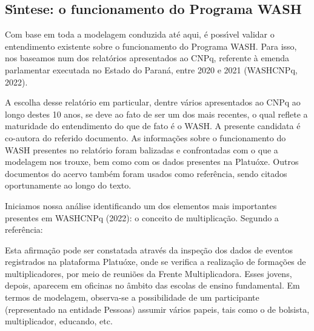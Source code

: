 \documentclass[
12pt,		%
openright,	%
twoside,  %
a4paper,			%
chapter=TITLE,		%
english,			%
french,				%
spanish,			%
brazil				%
]{USPSC-classe/USPSC}
\begin{document}
\subsection[S\'{\i}ntese: o funcionamento do Programa WASH]{S\'{\i}ntese: o funcionamento do Programa WASH}\label{S\'{\i}ntese: o funcionamento do Programa WASH}
Com base em toda a modelagem conduzida at\'e aqui, \'e poss\'{\i}vel validar o entendimento existente sobre o funcionamento do Programa WASH. Para isso, nos baseamos num dos relat\'orios apresentados ao CNPq, referente \`a emenda parlamentar executada no Estado do Paran\'a, entre 2020 e 2021  (WASHCNPq, 2022).




A escolha desse relat\'orio em particular, dentre v\'arios apresentados ao CNPq ao longo destes 10 anos, se deve ao fato de ser um dos mais recentes, o qual reflete a maturidade do entendimento do que de fato \'e o WASH. A presente candidata \'e co-autora do referido documento. As informa\c{c}\~oes sobre o funcionamento do WASH presentes no relat\'orio foram balizadas e confrontadas com o que a modelagem nos trouxe, bem como com os dados presentes na Platu\'oxe. Outros documentos do acervo tamb\'em foram usados como refer\^encia, sendo citados oportunamente ao longo do texto.




Iniciamos nossa an\'alise identificando um dos elementos mais importantes presentes em WASHCNPq (2022): o conceito de multiplica\c{c}\~ao. Segundo a refer\^encia:





\noindent\begin{center}\mbox{\centering{}}\end{center}


Esta afirma\c{c}\~ao pode ser constatada atrav\'es da inspe\c{c}\~ao dos dados de eventos registrados na plataforma Platu\'oxe, onde se verifica a realiza\c{c}\~ao de forma\c{c}\~oes de multiplicadores, por meio de reuni\~oes da Frente Multiplicadora. Esses jovens, depois, aparecem em oficinas no \^ambito das escolas de ensino fundamental. Em termos de modelagem, observa-se a possibilidade de um participante (representado na entidade \textquotedbl Pessoas\textquotedbl ) assumir v\'arios papeis, tais como o de bolsista, multiplicador, educando, etc.
\end{document}
